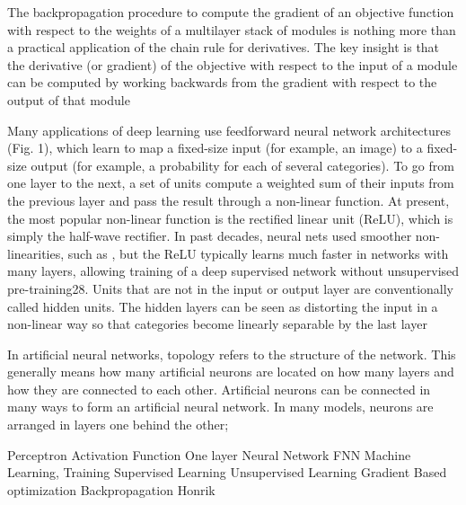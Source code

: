 The backpropagation procedure to compute the gradient of an objective function with respect to the weights of a multilayer stack of modules is nothing more than a practical application of the chain rule for derivatives. The key insight is that the derivative (or gradient) of the objective with respect to the input of a module can be computed by working backwards from the gradient with respect to the output of that module

Many applications of deep learning use feedforward neural network architectures (Fig. 1), which learn to map a fixed-size input (for example, an image) to a fixed-size output (for example, a probability for each of several categories). To go from one layer to the next, a set of units compute a weighted sum of their inputs from the previous layer and pass the result through a non-linear function. At present, the most popular non-linear function is the rectified linear unit (ReLU), which is simply the half-wave rectifier. In past decades, neural nets used smoother non-linearities, such as , but the ReLU typically learns much faster in networks with many layers, allowing training of a deep supervised network without unsupervised pre-training28. Units that are not in the input or output layer are conventionally called hidden units. The hidden layers can be seen as distorting the input in a non-linear way so that categories become linearly separable by the last layer 


In artificial neural networks, topology refers to the structure of the network. This generally means how many artificial neurons are located on how many layers and how they are connected to each other. Artificial neurons can be connected in many ways to form an artificial neural network. In many models, neurons are arranged in layers one behind the other; 

Perceptron
Activation Function
One layer
Neural Network
FNN
Machine Learning, Training 
Supervised Learning
Unsupervised Learning
Gradient Based optimization
Backpropagation 
Honrik 